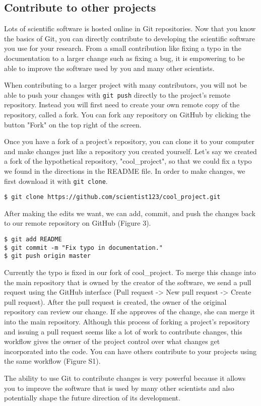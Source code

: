 \subsection{Contribute to other projects}

Lots of scientific software is hosted online in Git repositories.
Now that you know the basics of Git, you can directly contribute to developing the scientific software you use for your research.
From a small contribution like fixing a typo in the documentation to a larger change such as fixing a bug, it is empowering to be able to improve the software used by you and many other scientists.

When contributing to a larger project with many contributors, you will not be able to push your changes with \verb|git push| directly to the project's remote repository.
Instead you will first need to create your own remote copy of the repository, called a fork.
You can fork any repository on GitHub by clicking the button "Fork" on the top right of the screen.

Once you have a fork of a project's repository, you can clone it to your computer and make changes just like a repository you created yourself.
Let's say we created a fork of the hypothetical repository, "cool\_project", so that we could fix a typo we found in the directions in the README file.
In order to make changes, we first download it with \verb|git clone|.

\begin{lstlisting}
$ git clone https://github.com/scientist123/cool_project.git
\end{lstlisting}

After making the edits we want, we can add, commit, and push the changes back to our remote repository on GitHub (Figure 3).

\begin{lstlisting}
$ git add README
$ git commit -m "Fix typo in documentation."
$ git push origin master
\end{lstlisting}

Currently the typo is fixed in our fork of cool\_project.
To merge this change into the main repository that is owned by the creator of the software, we send a pull request using the GitHub interface (Pull request -> New pull request -> Create pull request).
After the pull request is created, the owner of the original repository can review our change.
If she approves of the change, she can merge it into the main repository.
Although this process of forking a project’s repository and issuing a pull request seems like a lot of work to contribute changes, this workflow gives the owner of the project control over what changes get incorporated into the code. You can have others contribute to your projects using the same workflow (Figure S1). 

The ability to use Git to contribute changes is very powerful because it allows you to improve the software that is used by many other scientists and also potentially shape the future direction of its development.
